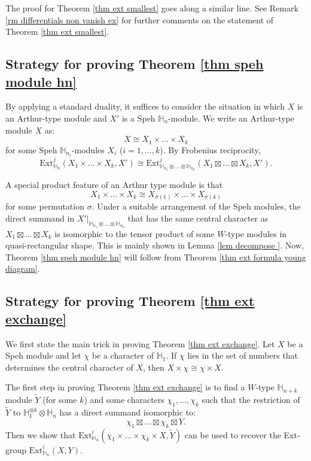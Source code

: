 \documentclass[11pt]{amsart}
\numberwithin{equation}{section}
\theoremstyle{definition}
\begin{document}
The proof for Theorem \ref{thm ext smallest} goes along a similar line. See Remark \ref{rm differentials non vanish ex} for further comments on the statement of  Theorem \ref{thm ext smallest}.

\subsection{Strategy for proving Theorem \ref{thm speh module hn}}

By applying a standard duality, it suffices to consider the situation in which \(X\) is an Arthur-type module and \(X'\) is a Speh \(\mathbb H_n\)-module. We write an Arthur-type module \(X\) as:
\[  X \cong X_1 \times \ldots \times X_k
\]
for some Speh \(\mathbb H_{n_i}\)-modules \(X_i\) (\(i=1,\ldots, k\)). By Frobenius reciprocity,
\[  \mathrm{Ext}^j_{\mathbb H_n}(X_1\times \ldots \times X_k, X')\cong \mathrm{Ext}^j_{\mathbb H_{n_1}\otimes \ldots \otimes \mathbb H_{n_k}}(X_1\boxtimes \ldots \boxtimes X_k, X') .
\]

A special product feature of an Arthur type module is that 
\[  X_1 \times \ldots \times X_k \cong X_{\sigma(1)} \times \ldots \times X_{\sigma(k)}
\]
for some permutation $\sigma$. Under a suitable arrangement of the Speh modules, the direct summand in \(X'|_{\mathbb H_{n_1}\otimes \ldots \otimes \mathbb H_{n_k}}\) that has the same central character as \(X_1 \boxtimes \ldots \boxtimes X_k\) is isomorphic to the tensor product of some \(W\)-type modules in quasi-rectangular shape. This is mainly shown in Lemma \ref{lem decompose }. Now, Theorem  \ref{thm speh module hn} will follow from Theorem \ref{thm ext formula young diagram}.


\subsection{Strategy for proving Theorem \ref{thm ext exchange}}

We first state the main trick in proving Theorem \ref{thm ext exchange}. Let \(X\) be a Speh module and let \( \chi\) be a character of \(\mathbb H_1\). If \( \chi \) lies in the set of numbers that determines the central character of \(X\), then 
\( X \times \chi \cong \chi \times X \).



The first step in proving Theorem \ref{thm ext exchange} is to find a \(W\)-type $\mathbb H_{n+k}$ module $\widetilde{Y}$ (for some \(k\)) and some characters $\chi_1, \ldots, \chi_k$ such that the restriction of $\widetilde{Y}$ to $\mathbb H_1^{\otimes k}\otimes \mathbb H_n$ has a direct summand isomorphic to:
\[   \chi_1 \boxtimes \ldots \boxtimes \chi_k \boxtimes Y .
\]
Then we show that \(  \mathrm{Ext}^i_{\mathbb H_n}(\chi_1\times \ldots \times \chi_k\times X, \widetilde{Y}) 
\)
can be used to recover the Ext-group \( \mathrm{Ext}^i_{\mathbb H_n}(X, Y) \). 
\end{document}
